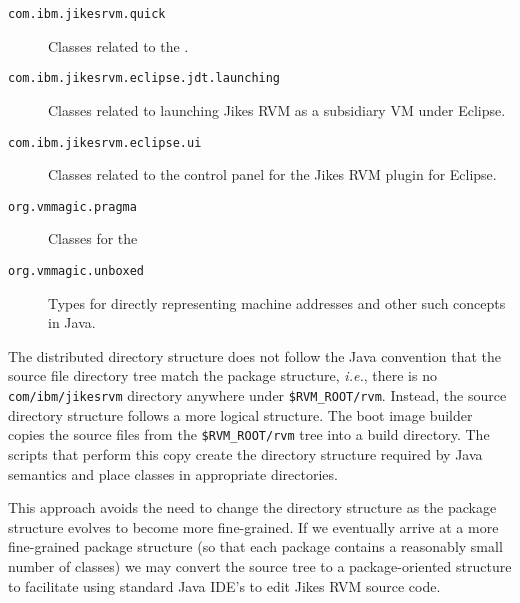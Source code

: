 \begin{description}
\item[\texttt{com.ibm.jikesrvm.quick}] Classes related to
the .

\item[\texttt{com.ibm.jikesrvm.eclipse.jdt.launching}] Classes related
to launching Jikes RVM as a subsidiary VM under Eclipse. 

\item[\texttt{com.ibm.jikesrvm.eclipse.ui}] Classes related
to the control panel for the Jikes RVM plugin for Eclipse.

\item[\texttt{org.vmmagic.pragma}] Classes for the 


\item[\texttt{org.vmmagic.unboxed}] Types for directly representing
machine addresses and other such concepts in Java.


\end{description}

The distributed directory structure
does not follow the Java\TMweb{} convention that the source file directory tree
match the package structure, {\it i.e.},
there is no {\tt com/ibm/jikesrvm} directory anywhere under \texttt{\$RVM\_ROOT/rvm}.  Instead, the source directory structure follows a more logical 
structure.  The boot image builder
copies the source files from the \texttt{\$RVM\_ROOT/rvm} tree into a build
directory.  The scripts that perform this copy create the directory
structure required by Java semantics and place classes in appropriate
directories.

This approach avoids the need to change the directory structure as the
package structure evolves to become more fine-grained. If we
eventually arrive at a more fine-grained package structure (so that
each package contains a reasonably small number of classes) we may
convert the source tree to a package-oriented structure to facilitate
using standard Java IDE's to edit Jikes RVM source code.
